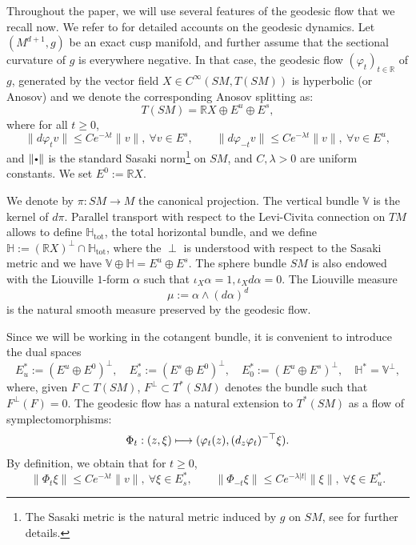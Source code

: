 \documentclass[10pt]{amsart}
\newcommand\mto{\mathchoice{\longmapsto}{\mapsto}{\mapsto}{\mapsto}}
\newcommand{\sbullet}{{\scriptscriptstyle\bullet}}
\newcommand{\csbullet}{{\raisebox{1pt}{$\sbullet$}}}
\newcommand{\R}{\mathbb{R}}
\newcommand{\V}{\mathbb{V}}
\newcommand{\HH}{\mathbb{H}}
\theoremstyle{plain}
\theoremstyle{definition}
\begin{document}
Throughout the paper, we will use several features of the geodesic flow that we recall now. We refer to \cite{Paternain-99, Knieper-02} for detailed accounts on the geodesic dynamics. Let $(M^{d+1},g)$ be an exact cusp manifold, and further assume that the sectional curvature of $g$ is everywhere negative. In that case, the geodesic flow $(\varphi_t)_{t \in \R}$ of $g$, generated by the vector field $X \in C^\infty(SM,T(SM))$ is hyperbolic (or Anosov) and we denote the corresponding Anosov splitting as:
\[
T(SM)=\R X \oplus E^u \oplus E^s,
\]
where for all $t \geq 0$,
\begin{equation}
\|d\varphi_{t} v\| \leq C e^{-\lambda t} \|v\|,\ \forall v \in E^{s}, \qquad \|d\varphi_{- t} v\| \leq C e^{-\lambda t} \|v\|,\ \forall v \in E^{u},
\end{equation}
and $\|\csbullet\|$ is the standard Sasaki norm\footnote{The Sasaki metric is the natural metric induced by $g$ on $SM$, see \cite[Ch.\,1]{Paternain-99} for further details.} on $SM$, and $C,\lambda > 0$ are uniform constants. We set $E^0 := \R X$.

We denote by $\pi:SM\to M$ the canonical projection. The vertical bundle $\V$ is the kernel of $d\pi$. Parallel transport with respect to the Levi-Civita connection on $TM$ allows to define $\HH_{\mathrm{tot}}$, the total horizontal bundle, and we define $\HH := (\R X)^\perp \cap \HH_{\mathrm{tot}}$, where the $\perp$ is understood with respect to the Sasaki metric and we have $\V\oplus\HH = E^u\oplus E^s$. The sphere bundle $SM$ is also endowed with the Liouville $1$-form $\alpha$ such that $\iota_X \alpha = 1, \iota_X d \alpha = 0$. The Liouville measure
\begin{equation}
\label{equation:liouville}
\mu := \alpha \wedge (d\alpha)^d
\end{equation}
is the natural smooth measure preserved by the geodesic flow.

Since we will be working in the cotangent bundle, it is convenient to introduce the dual spaces
\[
E^\ast_u:= (E^u\oplus E^0)^\perp,\quad E^\ast_s := (E^s \oplus E^0)^\perp,\quad E^\ast_0:= (E^u\oplus E^s)^\perp,\quad \HH^\ast = \V^\perp,
\]
where, given $F \subset T(SM)$, $F^\perp \subset T^*(SM)$ denotes the bundle such that $F^\perp(F)=0$.
The geodesic flow has a natural extension to $T^\ast(SM)$ as a flow of symplectomorphisms:
\begin{equation}
\label{equation:symp}
\Phi_t:(z, \xi) \mto (\varphi_t(z), (d_z\varphi_{t})^{-\top} \xi).
\end{equation}
By definition, we obtain that for $t\geq 0$,
\begin{equation}\label{eq:costable-counstable}
\|\Phi_{t} \xi\| \leq C e^{-\lambda t} \|v\|,\ \forall \xi \in E^\ast_{s}, \qquad \|\Phi_{- t} \xi\| \leq C e^{-\lambda |t|} \|\xi\|,\ \forall \xi \in E^\ast_{u}.
\end{equation}
\end{document}
